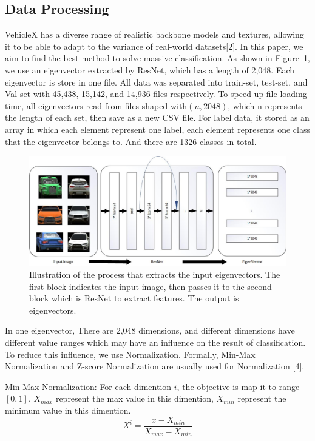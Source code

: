 \documentclass[runningheads]{llncs}
\begin{document}
\subsection{Data Processing}
VehicleX has a diverse range of realistic backbone models and textures, allowing it to be able to adapt to the variance of real-world datasets[2]. In this paper, we aim to find the best method to solve massive classification.  As shown in Figure~\ref{fig1}, we use an eigenvector extracted by ResNet, which has a length of 2,048. Each eigenvector is store in one file. All data was separated into train-set, test-set, and Val-set with 45,438, 15,142, and 14,936 files respectively. To speed up file loading time, all eigenvectors read from files shaped with$(n, 2048)$, which n represents the length of each set, then save as a new CSV file. For label data, it stored as an array in which each element represent one label, each element represents one class that the eigenvector belongs to. And there are 1326 classes in total.

\begin{figure}
	\includegraphics[width=\textwidth]{fig1.jpg}
	\caption{Illustration of the process that extracts the input eigenvectors. The first block indicates the input image, then passes it to the second block which is ResNet to extract features. The output is eigenvectors.} \label{fig1}
\end{figure}

In one eigenvector, There are 2,048 dimensions, and different dimensions have different value ranges which may have an influence on the result of classification. To reduce this influence, we use Normalization. Formally, Min-Max Normalization and Z-score Normalization are usually used for Normalization [4].

Min-Max Normalization: For each dimention $i$, the objective is map it to range $[0,1]$. $X_{max}$ represent the max value in this dimention, $X_{min}$ represent the minimum value in this dimention.
\begin{equation}
	X^i=\frac{x-X_{min}}{X_{max}-X_{min}}
\end{equation}
\end{document}
